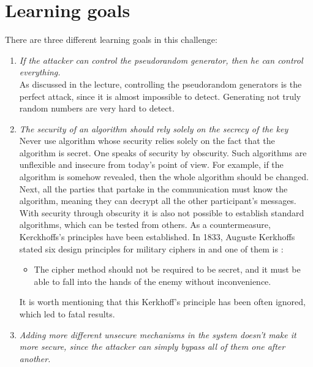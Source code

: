 \documentclass[11pt]{article}
\begin{document}
\section{Learning goals}
There are three different learning goals in this challenge:
\begin{enumerate}
\item \textit{If the attacker can control the pseudorandom generator, then he can control everything.} \\
	As discussed in the lecture, controlling the pseudorandom generators is the perfect attack, since it is almost impossible to detect. Generating not truly random numbers are very hard to detect. 
	
\item \textit{The security of an algorithm should rely solely on the secrecy of the key} \cite{katzlindell} \\
Never use algorithm whose security relies solely on the fact that the algorithm is secret. One speaks of security by obscurity. Such algorithms are unflexible and insecure from today’s point of view. For example, if the algorithm is somehow revealed, then the whole algorithm should be changed. Next, all the parties that partake in the communication must know the algorithm, meaning they can decrypt all the other participant’s messages. With security through obscurity it is also not possible to establish standard algorithms, which can be tested from others. As a countermeasure, Kerckhoffs's principles have been established. 
In 1833, Auguste Kerkhoffs stated six design principles for military ciphers in \cite{Kerckhoffs83} and one of them is \cite{katzlindell}:
\begin{itemize}
\item The cipher method should not be required to be secret, and it must be able to fall into the hands of the enemy without inconvenience.
\end{itemize}
It is worth mentioning that this Kerkhoff's principle has been often ignored, which led to fatal results. 
	\item \textit{Adding more different unsecure mechanisms in the system doesn't make it more secure, since the attacker can simply bypass all of them one after another.}\\
	
\end{enumerate}
\end{document}
